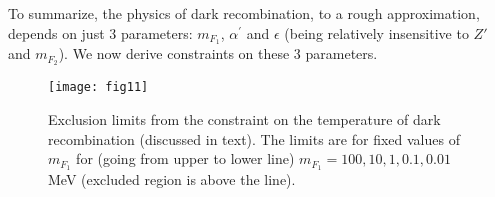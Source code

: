 \documentclass[12pt]{article}
\begin{document}
To summarize, the physics of dark recombination, to a rough
approximation, depends on just 3 parameters: $m _{F_1}$, $\alpha ^{'}$
and $\epsilon$ (being relatively insensitive to $Z'$ and $m _{F_2}$). We
now derive constraints on these 3 parameters.

\vskip 0.8cm
\begin{figure}[htpb]
    \centering
        \texttt{[image: fig11]}
    \caption{Exclusion limits from the constraint on the temperature of
dark recombination (discussed in text). The limits are for fixed values
of $m _{F_1}$ for (going from upper to lower line) $m _{F_1} = 100, 10,
1, 0.1, 0.01$ MeV (excluded region is above the line).}
    \label{fig:Exclusion dark recombination mf1}
\vskip 0.8cm
\end{figure}
\end{document}
